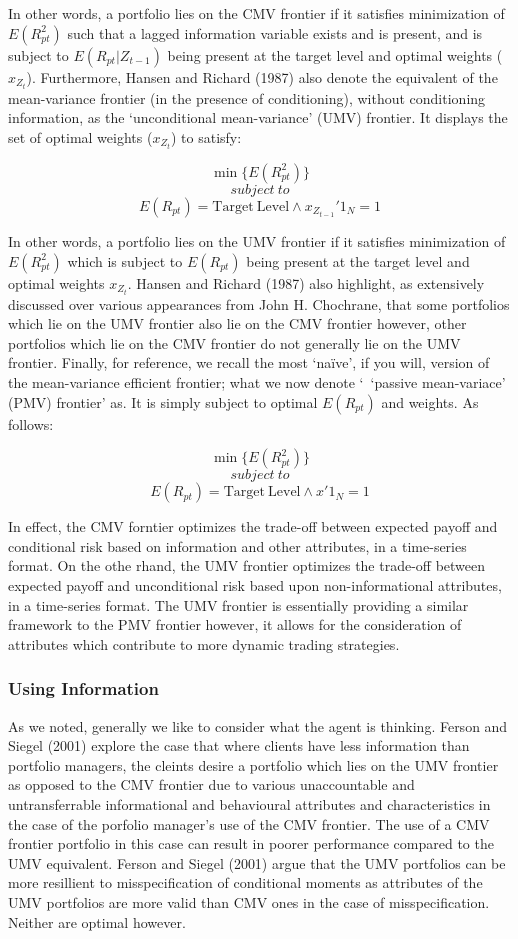 \documentclass[11pt, english]{article}
\begin{document}
	In other words, a portfolio lies on the CMV frontier if it satisfies minimization of $E(R_{pt}^2)$ such that a lagged information variable exists and is present, and is subject to $E(R_{pt}|Z_{t-1})$ being present at the target level and optimal weights ($x_{Z_t}$). Furthermore, Hansen and Richard (1987) also denote the equivalent of the mean-variance frontier (in the presence of conditioning), without conditioning information, as the `unconditional mean-variance' (UMV) frontier. It displays the set of optimal weights ($x_{Z_t}$) to satisfy:

	$$\min\{E(R_{pt}^2)\}$$
	$$subject\ to$$
	$$E(R_{pt})=\mathrm{Target\ Level}\land x_{Z_{t-1}}'1_N=1$$

	In other words, a portfolio lies on the UMV frontier if it satisfies minimization of $E(R_{pt}^2)$ which is subject to $E(R_{pt})$ being present at the target level and optimal weights $x_{Z_t}$. Hansen and Richard (1987) also highlight, as extensively discussed over various appearances from John H. Chochrane, that some portfolios which lie on the UMV frontier also lie on the CMV frontier however, other portfolios which lie on the CMV frontier do not generally lie on the UMV frontier. Finally, for reference, we recall the most `na\"{i}ve', if you will, version of the mean-variance efficient frontier; what we now denote `\ `passive mean-variace' (PMV) frontier' as. It is simply subject to optimal $E(R_{pt})$ and weights. As follows:

	$$\min\{E(R_{pt}^2)\}$$
	$$subject\ to$$
	$$E(R_{pt})=\mathrm{Target\ Level}\land x'1_N=1$$

	In effect, the CMV forntier optimizes the trade-off between expected payoff and conditional risk based on information and other attributes, in a time-series format. On the othe rhand, the UMV frontier optimizes the trade-off between expected payoff and unconditional risk based upon non-informational attributes, in a time-series format. The UMV frontier is essentially providing a similar framework to the PMV frontier however, it allows for the consideration of attributes which contribute to more dynamic trading strategies.

		\subsubsection*{Using Information}
	
	As we noted, generally we like to consider what the agent is thinking. Ferson and Siegel (2001) explore the case that where clients have less information than portfolio managers, the cleints desire a portfolio which lies on the UMV frontier as opposed to the CMV frontier due to various unaccountable and untransferrable informational and behavioural attributes and characteristics in the case of the porfolio manager's use of the CMV frontier. The use of a CMV frontier portfolio in this case can result in poorer performance compared to the UMV equivalent. Ferson and Siegel (2001) argue that the UMV portfolios can be more resillient to misspecification of conditional moments as attributes of the UMV portfolios are more valid than CMV ones in the case of misspecification. Neither are optimal however.\\
\end{document}
